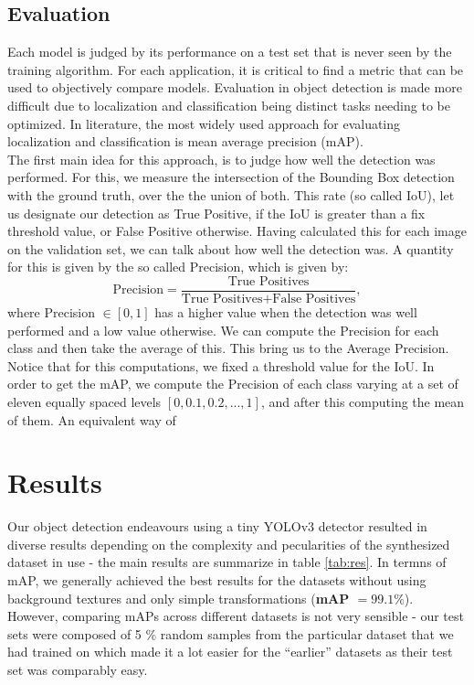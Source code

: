 \documentclass[a4paper]{article}
\begin{document}
\subsection{Evaluation}
Each model is judged by its performance on a test set that is never seen by the training algorithm. For each application, it is critical to find a metric that can be used to objectively compare models.
Evaluation in object detection is made more difficult due to localization and classification being distinct tasks needing to be optimized.  
In literature, the most widely used approach for evaluating localization and classification is mean average precision (mAP).  \\
The first main idea for this approach, is to judge how well the detection was performed.  For this, we measure the intersection of the Bounding Box detection with the ground truth, over the the union of both.  This rate (so called IoU), let us designate our detection as True Positive, if the IoU is greater than a fix threshold value, or False Positive otherwise.
Having calculated this for each image on the validation set, we can talk about how well the detection was.  A quantity for this is given by the so called Precision, which is given by:
\[\text{Precision} = \frac{\text{True Positives}}{\text{True Positives}+\text{False Positives}}, \]
where Precision $\in [0,1]$ has a higher value when the detection was well performed and a low value otherwise.
We can compute the Precision for each class and then take the average of this.  This bring us to the Average Precision. \\
Notice that for this computations, we fixed a threshold value for the IoU.   In order to get the mAP, we compute the Precision of each class varying at a set of eleven equally spaced levels 
$[0, 0.1, 0.2, ... , 1]$, and after this computing the mean of them. 
An equivalent way of 

\section{Results}
Our object detection endeavours using a tiny YOLOv3 detector resulted in diverse results depending on the complexity and pecularities of the synthesized dataset in use - the main results are summarize in table \ref{tab:res}. In termns of mAP, we generally achieved the best results for the datasets without using background textures and only simple transformations (\textbf{mAP $=99.1 \%$}). However, comparing mAPs across different datasets is not very sensible - our test sets were composed of 5 \% random samples from the particular dataset that we had trained on which made it a lot easier for the ``earlier'' datasets as their test set was comparably easy.
\end{document}
